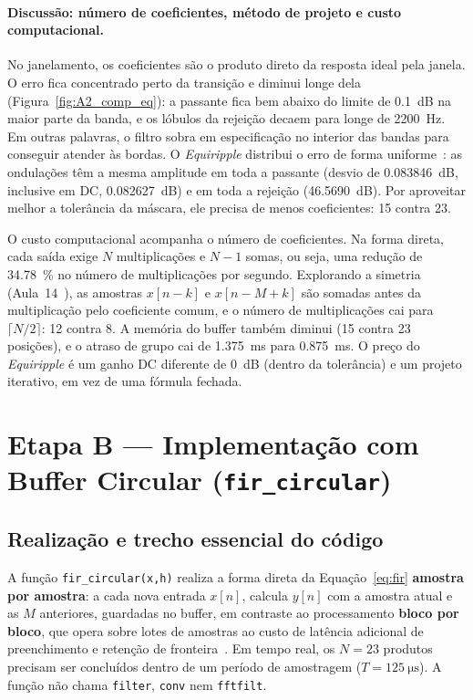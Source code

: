 \documentclass[11pt,a4paper]{article}
\begin{document}
\paragraph{Discussão: número de coeficientes, método de projeto e custo computacional.}
No janelamento, os coeficientes são o produto direto da resposta ideal pela janela. O erro fica concentrado perto da transição e diminui longe dela (Figura~\ref{fig:A2_comp_eq}): a passante fica bem abaixo do limite de \SI{0,1}{dB} na maior parte da banda, e os lóbulos da rejeição decaem para longe de \SI{2200}{Hz}. Em outras palavras, o filtro sobra em especificação no interior das bandas para conseguir atender às bordas. O \textit{Equiripple} distribui o erro de forma uniforme~\cite{manolakis2011}: as ondulações têm a mesma amplitude em toda a passante (desvio de \SI{0,083846}{dB}, inclusive em DC, \SI{+0,082627}{dB}) e em toda a rejeição (\SI{46,5690}{dB}). Por aproveitar melhor a tolerância da máscara, ele precisa de menos coeficientes: 15 contra 23.

O custo computacional acompanha o número de coeficientes. Na forma direta, cada saída exige $N$ multiplicações e $N - 1$ somas, ou seja, uma redução de \SI{34,78}{\percent} no número de multiplicações por segundo. Explorando a simetria (Aula~14~\cite{aula14}), as amostras $x[n-k]$ e $x[n-M+k]$ são somadas antes da multiplicação pelo coeficiente comum, e o número de multiplicações cai para $\lceil N/2 \rceil$: 12 contra 8. A memória do buffer também diminui (15 contra 23 posições), e o atraso de grupo cai de \SI{1,375}{ms} para \SI{0,875}{ms}. O preço do \textit{Equiripple} é um ganho DC diferente de \SI{0}{dB} (dentro da tolerância) e um projeto iterativo, em vez de uma fórmula fechada.

\FloatBarrier
\section{Etapa B — Implementação com Buffer Circular (\texttt{fir\_circular})}

\subsection{Realização e trecho essencial do código}

A função \texttt{fir\_circular(x,h)} realiza a forma direta da Equação~\eqref{eq:fir} \textbf{amostra por amostra}: a cada nova entrada $x[n]$, calcula $y[n]$ com a amostra atual e as $M$ anteriores, guardadas no buffer, em contraste ao processamento \textbf{bloco por bloco}, que opera sobre lotes de amostras ao custo de latência adicional de preenchimento e retenção de fronteira~\cite{aula16}. Em tempo real, os $N = 23$ produtos precisam ser concluídos dentro de um período de amostragem ($T = \SI{125}{\micro\second}$). A função não chama \texttt{filter}, \texttt{conv} nem \texttt{fftfilt}.
\end{document}
